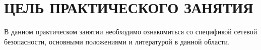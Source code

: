 \section{ЦЕЛЬ ПРАКТИЧЕСКОГО ЗАНЯТИЯ}

В данном практическом занятии необходимо ознакомиться со спецификой сетевой безопасности,
основными положениями и литературой в данной области.

\newpage

